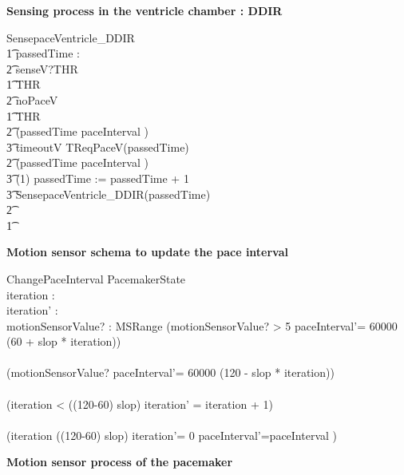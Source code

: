 \textbf {Sensing process in the ventricle chamber : DDIR}\\

\begin{circusaction}
SensepaceVentricle\_DDIR \circdef \\
\t1 \circvres passedTime : \nat \\
\t2 \circspot senseV?THR \then \\
\t1 \circif  THR  \circthen\\
\t2 noPaceV \then \Skip \\
\t1 \circelse \lnot  THR  \circthen\\
\t2 \circif  (passedTime \geq paceInterval ) \circthen \\
\t3 timeoutV \then TReqPaceV(passedTime)\\
\t2 \circelse \lnot (passedTime \geq paceInterval ) \circthen \\
\t3 \circwait(1) \circseq passedTime := passedTime + 1 \circseq \\
\t3 SensepaceVentricle\_DDIR(passedTime) \\
\t2 \circfi\\ 
\t1 \circfi \\ 
\end{circusaction}




\textbf{Motion sensor schema to update the pace interval} 

\begin{schema}{ChangePaceInterval}
\Delta PacemakerState \\
iteration : \nat \\
iteration' : \nat \\
motionSensorValue? : MSRange 
\where
(motionSensorValue? > 5 \land paceInterval'= 60000 \div (60 + slop * iteration))\\
\lor \\
(motionSensorValue?  \land paceInterval'= 60000 \div (120 - slop * iteration))\\
\land \\
(iteration < ((120-60) \div slop) \land iteration' = iteration + 1)   \\
\lor \\
(iteration \geq ((120-60) \div slop) \land iteration'= 0 \land paceInterval'=paceInterval ) \\  
\end{schema}

\textbf{Motion sensor process of the pacemaker} 

